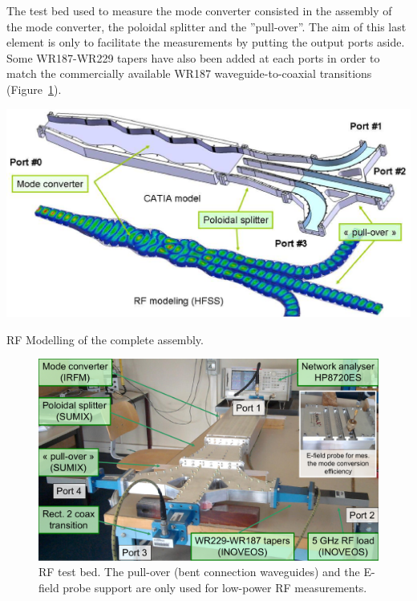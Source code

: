 {The test bed used to measure the mode converter consisted in the assembly of the mode converter, the poloidal splitter and the ''pull-over''. The aim of this last element is only to facilitate the measurements by putting the output ports aside. Some WR187-WR229 tapers have also been added at each ports in order to match the commercially available WR187 waveguide-to-coaxial transitions (Figure~\ref{fig:RFTestBed}).

\begin{marginfigure}
	\includegraphics[width=1.0\linewidth]{figures/chap3/ITER_modeconverter/LH4ITER_ModeConverterMockUpCAD}
	\caption{RF Modelling of the complete assembly.}
	\label{fig:lh4itermodeconvertermockupcad}
\end{marginfigure}


\begin{figure}[h]
	\includegraphics[width=1.0\textwidth]{figures/chap3/ITER_modeconverter/Test_RFTestBed}
	\caption{RF test bed. The pull-over (bent connection waveguides) and the E-field probe support are only used for low-power RF measurements.}
	\label{fig:RFTestBed}
\end{figure}

}
